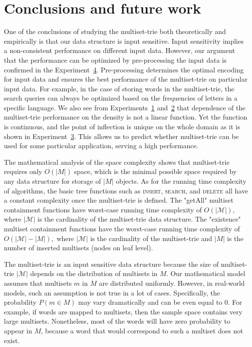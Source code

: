 \section{Conclusions and future work} \label{c:conclusions}

%
%
One of the conclusions of studying the multiset-trie both theoretically and empirically is that our data structure is input sensitive. Input sensitivity implies a non-consistent performance on different input data. However, our argument that the performance can be optimized by pre-processing the input data is confirmed in the Experiment~\hyperref[ss:exp3]{4}. Pre-processing determines the optimal encoding for input data and ensures the best performance of the multiset-trie on particular input data. For example, in the case of storing words in the multiset-trie, the search queries can always be optimized based on the frequencies of letters in a specific language. We also see from Experiments~\hyperref[s:exp1]{1} and~\hyperref[s:exp2]{2} that dependence of the multiset-trie performance on the density is not a linear function. Yet the function is continuous, and the point of inflection is unique on the whole domain as it is shown in Experiment~\hyperref[s:exp3]{3}. This allows us to predict whether multiset-trie can be used for some particular application, serving a high performance. 

%
%
The mathematical analysis of the space complexity shows that multiset-trie requires only $O(|M|)$ space, which is the minimal possible space required by any data structure for storage of $|M|$ objects. As for the running time complexity of algorithms, the basic tree functions such as \textsc{insert}, \textsc{search}, and \textsc{delete} all have a constant complexity once the multiset-trie is defined. The "getAll" multiset containment functions have worst-case running time complexity of $O(|\mathcal{M}|),$ where $|\mathcal{M}|$ is the cardinality of the multiset-trie data structure. The "existence" multiset containment functions have the worst-case running time complexity of $O(|\mathcal{M}| - |M|),$ where $|\mathcal{M}|$ is the cardinality of the multiset-trie and $|M|$ is the number of inserted multisets (nodes on leaf level). 

The multiset-trie is an input sensitive data structure because the size of multiset-trie $|\mathcal{M}|$ depends on the distribution of multisets in $M.$ Our mathematical model assumes that multisets $m$ in $M$ are distributed uniformly. However, in real-world models, such an assumption is not true in a lot of cases. Specifically, the probability $P(m\in M)$ may vary dramatically and can be even equal to $0.$ For example, if words are mapped to multisets, then the sample space contains very large multisets. Nonetheless, most of the words will have zero probability to appear in $M$, because a word that would correspond to such a multiset does not exist.%

